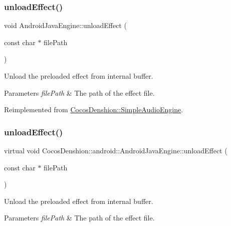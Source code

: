\subsubsection{\texorpdfstring{unload\+Effect()}{unloadEffect()}\hspace{0.1cm}{\footnotesize\ttfamily [1/2]}}
{\footnotesize\ttfamily void Android\+Java\+Engine\+::unload\+Effect (\begin{DoxyParamCaption}\item[{const char $\ast$}]{file\+Path }\end{DoxyParamCaption})\hspace{0.3cm}{\ttfamily [virtual]}}

Unload the preloaded effect from internal buffer.


\begin{DoxyParams}{Parameters}
{\em file\+Path} & The path of the effect file. \\
\hline
\end{DoxyParams}


Reimplemented from \hyperlink{classCocosDenshion_1_1SimpleAudioEngine_ad370e42405e90a0701fe9ee63d29c8e1}{Cocos\+Denshion\+::\+Simple\+Audio\+Engine}.

\mbox{\label{classCocosDenshion_1_1android_1_1AndroidJavaEngine_a7d11887670799c98fdeb2b7ece2efad9}} 
\subsubsection{\texorpdfstring{unload\+Effect()}{unloadEffect()}\hspace{0.1cm}{\footnotesize\ttfamily [2/2]}}
{\footnotesize\ttfamily virtual void Cocos\+Denshion\+::android\+::\+Android\+Java\+Engine\+::unload\+Effect (\begin{DoxyParamCaption}\item[{const char $\ast$}]{file\+Path }\end{DoxyParamCaption})\hspace{0.3cm}{\ttfamily [virtual]}}

Unload the preloaded effect from internal buffer.


\begin{DoxyParams}{Parameters}
{\em file\+Path} & The path of the effect file. \\
\hline
\end{DoxyParams}


